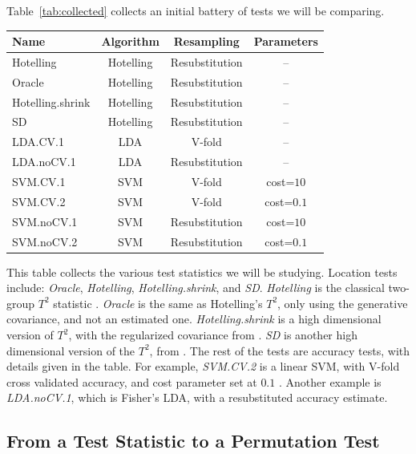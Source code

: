 \documentclass[12pt,a4paper]{article}
\begin{document}
\bigskip

Table~\ref{tab:collected} collects an initial battery of tests we will be comparing. 
\begin{tcolorbox}
\centering
\begin{tabular}{l|c|c|c}
Name & Algorithm & Resampling & Parameters\\ 
\hline
\hline
Hotelling & Hotelling & Resubstitution & -- \\ 
Oracle & Hotelling & Resubstitution & -- \\ 
Hotelling.shrink & Hotelling & Resubstitution & -- \\ 
SD & Hotelling & Resubstitution & -- \\ 
LDA.CV.1 	& LDA & V-fold 			&  -- \\ 
LDA.noCV.1 	& LDA & Resubstitution 	&  --\\ 
SVM.CV.1 	& SVM & V-fold 		    & cost=$10$ \\ 
SVM.CV.2 	& SVM & V-fold 		    & cost=$0.1$ \\ 
SVM.noCV.1 	& SVM & Resubstitution  & cost=$10$ \\ 
SVM.noCV.2 	& SVM & Resubstitution  & cost=$0.1$ \\ 
\end{tabular} 
\captionsetup{type=table}
\caption{\footnotesize
This table collects the various test statistics we will be studying. 
Location tests include: \textit{Oracle}, \textit{Hotelling}, \textit{Hotelling.shrink}, and \textit{SD}.
\textit{Hotelling} is the classical two-group $T^2$ statistic \citep{anderson_introduction_2003}. 
\textit{Oracle} is the same as Hotelling's $T^2$, only using the generative covariance, and not an estimated one.
\textit{Hotelling.shrink} is a high dimensional version of $T^2$, with the regularized covariance from \citet{schafer_shrinkage_2005}. 
\textit{SD} is another high dimensional version of the $T^2$, from \citet{srivastava_two_2013}.
The rest of the tests are accuracy tests, with details given in the table. 
For example, \textit{SVM.CV.2} is a linear SVM, with V-fold cross validated accuracy, and cost parameter set at $0.1$ \citep{meyer_e1071:_2015}.
Another example is \textit{LDA.noCV.1}, which is Fisher's LDA, with a resubstituted accuracy estimate.}
\label{tab:collected}
\end{tcolorbox}


\subsection{From a Test Statistic to a Permutation Test}
\end{document}
